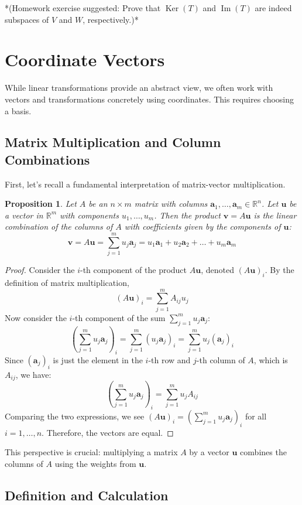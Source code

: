 \documentclass[11pt]{article}
\newtheorem{proposition}[theorem]{Proposition}
\theoremstyle{definition}
\theoremstyle{remark}
\DeclareMathOperator{\Ker}{Ker}
\DeclareMathOperator{\Image}{Im}
\begin{document}
*(Homework exercise suggested: Prove that $\Ker(T)$ and $\Image(T)$ are indeed subspaces of $V$ and $W$, respectively.)*

\section{Coordinate Vectors}

While linear transformations provide an abstract view, we often work with vectors and transformations concretely using coordinates. This requires choosing a basis.

\subsection{Matrix Multiplication and Column Combinations}

First, let's recall a fundamental interpretation of matrix-vector multiplication.

\begin{proposition}
Let $A$ be an $n \times m$ matrix with columns $\mathbf{a}_1, \dots, \mathbf{a}_m \in \mathbb{R}^n$. Let $\mathbf{u}$ be a vector in $\mathbb{R}^m$ with components $u_1, \dots, u_m$. Then the product $\mathbf{v} = A\mathbf{u}$ is the linear combination of the columns of $A$ with coefficients given by the components of $\mathbf{u}$:
\[ \mathbf{v} = A\mathbf{u} = \sum_{j=1}^m u_j \mathbf{a}_j = u_1 \mathbf{a}_1 + u_2 \mathbf{a}_2 + \dots + u_m \mathbf{a}_m \]
\end{proposition}
\begin{proof}
Consider the $i$-th component of the product $A\mathbf{u}$, denoted $(A\mathbf{u})_i$. By the definition of matrix multiplication,
\[ (A\mathbf{u})_i = \sum_{j=1}^m A_{ij} u_j \]
Now consider the $i$-th component of the sum $\sum_{j=1}^m u_j \mathbf{a}_j$:
\[ \left( \sum_{j=1}^m u_j \mathbf{a}_j \right)_i = \sum_{j=1}^m (u_j \mathbf{a}_j)_i = \sum_{j=1}^m u_j (\mathbf{a}_j)_i \]
Since $(\mathbf{a}_j)_i$ is just the element in the $i$-th row and $j$-th column of $A$, which is $A_{ij}$, we have:
\[ \left( \sum_{j=1}^m u_j \mathbf{a}_j \right)_i = \sum_{j=1}^m u_j A_{ij} \]
Comparing the two expressions, we see $(A\mathbf{u})_i = \left( \sum_{j=1}^m u_j \mathbf{a}_j \right)_i$ for all $i=1, \dots, n$. Therefore, the vectors are equal.
\end{proof}
This perspective is crucial: multiplying a matrix $A$ by a vector $\mathbf{u}$ combines the columns of $A$ using the weights from $\mathbf{u}$.

\subsection{Definition and Calculation}
\end{document}
